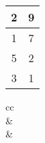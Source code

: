 \begin{table}[H]
\begin{tabular}{cc}
\multicolumn{1}{|c|}{2}                                                        & \multicolumn{1}{c|}{9}                                                             \\ \hline
\multicolumn{1}{|c|}{1}                                                        & \multicolumn{1}{c|}{7}                                                             \\ \hline
\multicolumn{1}{|c|}{5}                                                        & \multicolumn{1}{c|}{2}                                                             \\ \hline
\multicolumn{1}{|c|}{3}                                                        & \multicolumn{1}{c|}{1}                                                             \\ \hline
\end{tabular}
                        \begin{tabular}{cc}
                                                                                                                                                           \\ \hline
                        \rowcolor{\ccorange} 
                         &  \\ \hline
                                                                                &                                                              \\ \hline
\end{tabular}\end{table}